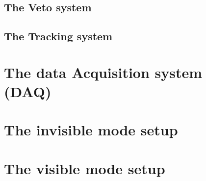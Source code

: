 \subsection{The Veto system}
\label{chapter1:sec:detectors-veto}

\subsection{The Tracking system}
\label{chapter1:sec:detectors-tracking}

\section{The data Acquisition system (DAQ)}
\label{chapter1:sec:daq}

\section{The invisible mode setup}
\label{chapter1:sec:invismode}

\section{The visible mode setup}
\label{chapter1:sec:vismode}

